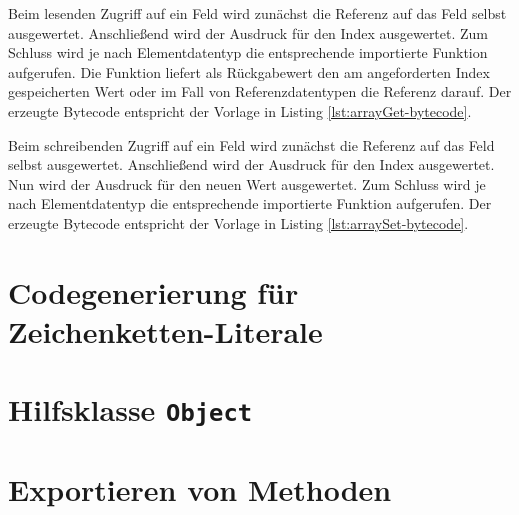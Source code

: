 Beim lesenden Zugriff auf ein Feld wird zunächst die Referenz auf das Feld selbst ausgewertet. Anschließend wird der Ausdruck für den Index ausgewertet. Zum Schluss wird je nach Elementdatentyp die entsprechende importierte Funktion aufgerufen. Die Funktion liefert als Rückgabewert den am angeforderten Index gespeicherten Wert oder im Fall von Referenzdatentypen die Referenz darauf. Der erzeugte Bytecode entspricht der Vorlage in Listing \ref{lst:arrayGet-bytecode}.



Beim schreibenden Zugriff auf ein Feld wird zunächst die Referenz auf das Feld selbst ausgewertet. Anschließend wird der Ausdruck für den Index ausgewertet. Nun wird der Ausdruck für den neuen Wert ausgewertet. Zum Schluss wird je nach Elementdatentyp die entsprechende importierte Funktion aufgerufen. Der erzeugte Bytecode entspricht der Vorlage in Listing \ref{lst:arraySet-bytecode}.



\section{Codegenerierung für Zeichenketten-Literale}

\section{Hilfsklasse \lstinline{Object}}

\section{Exportieren von Methoden}
